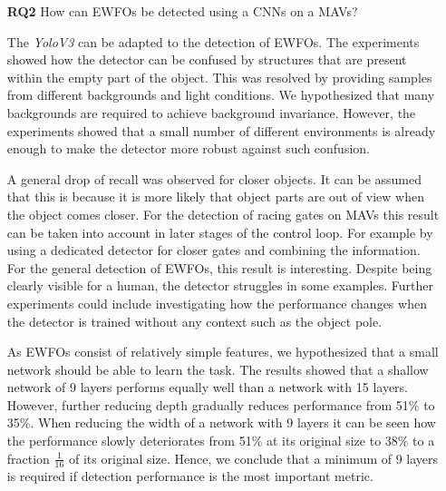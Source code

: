 \begin{enumerate}
	In summary, we propose to fully synthesize environments when creating training data for the detection of \acp{EWFO} on \acp{MAV}. Furthermore, the precision can be improved by training the detector based on view angles it will see in the real world, possibly by simulating the flight behaviour. In order to transfer the detector to the real world, we recommend to use image augmentation. Particularly augmenting the images by modelling lens distortion improves the performance on the investigated dataset.

	\item[\textbf{RQ2}]How can \acp{EWFO} be detected using a \acp{CNN} on a \acp{MAV}?
	
	The \textit{YoloV3} can be adapted to the detection of \acp{EWFO}. The experiments showed how the detector can be confused by structures that are present within the empty part of the object. This was resolved by providing samples from different backgrounds and light conditions. We hypothesized that many backgrounds are required to achieve background invariance. However, the experiments showed that a small number of different environments is already enough to make the detector more robust against such confusion.
		
	A general drop of recall was observed for closer objects. It can be assumed that this is because it is more likely that object parts are out of view when the object comes closer. For the detection of racing gates on \acp{MAV} this result can be taken into account in later stages of the control loop. For example by using a dedicated detector for closer gates and combining the information. For the general detection of \acp{EWFO}, this result is interesting. Despite being clearly visible for a human, the detector struggles in some examples. Further experiments could include investigating how the performance changes when the detector is trained without any context such as the object pole.
	
	As \acp{EWFO} consist of relatively simple features, we hypothesized that a small network should be able to learn the task. The results showed that a shallow network of 9 layers performs equally well than a network with 15 layers. However, further reducing depth gradually reduces performance from 51\% to 35\%. When reducing the width of a network with 9 layers it can be seen how the performance slowly deteriorates from 51\% at its original size to 38\% to a fraction $\frac{1}{16}$ of its original size. 
	Hence, we conclude that a minimum of 9 layers is required if detection performance is the most important metric.
	

\end{enumerate}
